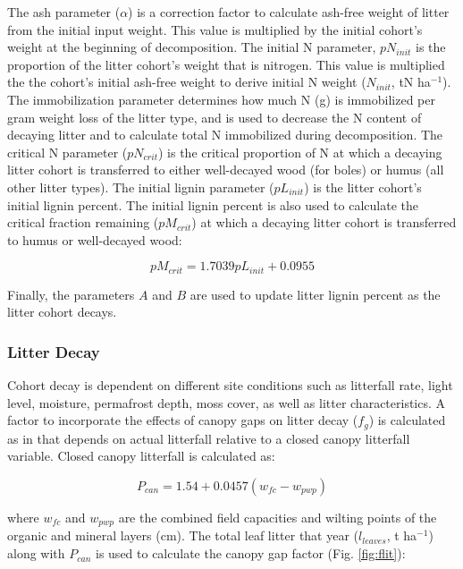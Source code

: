\documentclass[a4paper, 12pt] {report}
\begin{document}
The ash parameter ($\alpha$) is a correction factor to calculate ash-free weight of litter from the initial input weight. This value is multiplied by the initial cohort's weight at the beginning of decomposition. The initial N parameter, $pN_{init}$ is the proportion of the litter cohort's weight that is nitrogen. This value is multiplied the the cohort's initial ash-free weight to derive initial N weight ($N_{init}$, tN ha$^{-1}$). The immobilization parameter determines how much N (g) is immobilized per gram weight loss of the litter type, and is used to decrease the N content of decaying litter and to calculate total N immobilized during decomposition. The critical N parameter ($pN_{crit}$) is the critical proportion of N at which a decaying litter cohort is transferred to either well-decayed wood (for boles) or humus (all other litter types). The initial lignin parameter ($pL_{init}$) is the litter cohort's initial lignin percent. The initial lignin percent is also used to calculate the critical fraction remaining ($pM_{crit}$) at which a decaying litter cohort is transferred to humus or well-decayed wood:

\begin{equation}
pM_{crit} = 1.7039pL_{init} + 0.0955
\end{equation}

Finally, the parameters $A$ and $B$ are used to update litter lignin percent as the litter cohort decays.

\subsubsection{Litter Decay}

Cohort decay is dependent on different site conditions such as litterfall rate, light level, moisture, permafrost depth, moss cover, as well as litter characteristics.  A factor to incorporate the effects of canopy gaps on litter decay ($f_g$) is calculated as in  that depends on actual litterfall relative to a closed canopy litterfall variable. Closed canopy litterfall is calculated as:

\begin{equation}
P_{can} = 1.54 + 0.0457(w_{fc} - w_{pwp})
\end{equation}

where $w_{fc}$ and $w_{pwp}$ are the combined field capacities and wilting points of the organic and mineral layers (cm). The total leaf litter that year ($l_{leaves}$, t ha$^{-1}$) along with $P_{can}$ is used to calculate the canopy gap factor (Fig. \ref{fig:flit}):
\end{document}
